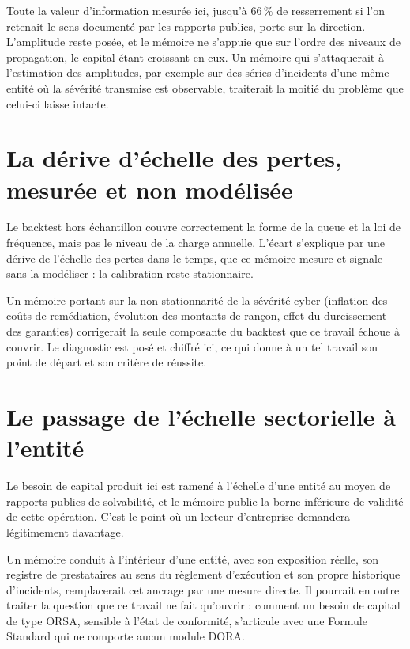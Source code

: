 Toute la valeur d'information mesurée ici, jusqu'à $66\,\%$ de resserrement si l'on retenait le
sens documenté par les rapports publics, porte sur la direction. L'amplitude reste posée, et le mémoire
ne s'appuie que sur l'ordre des niveaux de propagation, le capital étant croissant en eux. Un
mémoire qui s'attaquerait à l'estimation des amplitudes, par exemple sur des séries d'incidents
d'une même entité où la sévérité transmise est observable, traiterait la moitié du problème que
celui-ci laisse intacte.


\section{La dérive d'échelle des pertes, mesurée et non modélisée}

Le backtest hors échantillon couvre correctement la forme de la queue et la loi de fréquence, mais
pas le niveau de la charge annuelle. L'écart s'explique par une dérive de l'échelle des pertes dans
le temps, que ce mémoire mesure et signale sans la modéliser : la calibration reste stationnaire.

Un mémoire portant sur la non-stationnarité de la sévérité cyber (inflation des coûts de
remédiation, évolution des montants de rançon, effet du durcissement des garanties) corrigerait
la seule composante du backtest que ce travail échoue à couvrir. Le diagnostic est posé et chiffré
ici, ce qui donne à un tel travail son point de départ et son critère de réussite.

\section{Le passage de l'échelle sectorielle à l'entité}

Le besoin de capital produit ici est ramené à l'échelle d'une entité au moyen de rapports publics
de solvabilité, et le mémoire publie la borne inférieure de validité de cette opération. C'est le
point où un lecteur d'entreprise demandera légitimement davantage.

Un mémoire conduit à l'intérieur d'une entité, avec son exposition réelle, son registre de
prestataires au sens du règlement d'exécution et son propre historique d'incidents, remplacerait
cet ancrage par une mesure directe. Il pourrait en outre traiter la question que ce travail ne fait
qu'ouvrir : comment un besoin de capital de type ORSA, sensible à l'état de conformité,
s'articule avec une Formule Standard qui ne comporte aucun module DORA.

